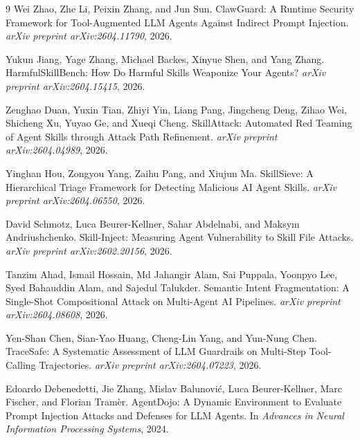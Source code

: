 \documentclass{article}
\begin{document}
{\begin{thebibliography}{9}
Wei Zhao, Zhe Li, Peixin Zhang, and Jun Sun.
\newblock ClawGuard: A Runtime Security Framework for Tool-Augmented LLM Agents Against Indirect Prompt Injection.
\newblock \emph{arXiv preprint arXiv:2604.11790}, 2026.

Yukun Jiang, Yage Zhang, Michael Backes, Xinyue Shen, and Yang Zhang.
\newblock HarmfulSkillBench: How Do Harmful Skills Weaponize Your Agents?
\newblock \emph{arXiv preprint arXiv:2604.15415}, 2026.

Zenghao Duan, Yuxin Tian, Zhiyi Yin, Liang Pang, Jingcheng Deng, Zihao Wei, Shicheng Xu, Yuyao Ge, and Xueqi Cheng.
\newblock SkillAttack: Automated Red Teaming of Agent Skills through Attack Path Refinement.
\newblock \emph{arXiv preprint arXiv:2604.04989}, 2026.

Yinghan Hou, Zongyou Yang, Zaihu Pang, and Xiujun Ma.
\newblock SkillSieve: A Hierarchical Triage Framework for Detecting Malicious AI Agent Skills.
\newblock \emph{arXiv preprint arXiv:2604.06550}, 2026.

David Schmotz, Luca Beurer-Kellner, Sahar Abdelnabi, and Maksym Andriushchenko.
\newblock Skill-Inject: Measuring Agent Vulnerability to Skill File Attacks.
\newblock \emph{arXiv preprint arXiv:2602.20156}, 2026.

Tanzim Ahad, Ismail Hossain, Md Jahangir Alam, Sai Puppala, Yoonpyo Lee, Syed Bahauddin Alam, and Sajedul Talukder.
\newblock Semantic Intent Fragmentation: A Single-Shot Compositional Attack on Multi-Agent AI Pipelines.
\newblock \emph{arXiv preprint arXiv:2604.08608}, 2026.

Yen-Shan Chen, Sian-Yao Huang, Cheng-Lin Yang, and Yun-Nung Chen.
\newblock TraceSafe: A Systematic Assessment of LLM Guardrails on Multi-Step Tool-Calling Trajectories.
\newblock \emph{arXiv preprint arXiv:2604.07223}, 2026.

Edoardo Debenedetti, Jie Zhang, Mislav Balunovi{\'c}, Luca Beurer-Kellner, Marc Fischer, and Florian Tram{\`e}r.
\newblock AgentDojo: A Dynamic Environment to Evaluate Prompt Injection Attacks and Defenses for LLM Agents.
\newblock In \emph{Advances in Neural Information Processing Systems}, 2024.


\end{thebibliography}}
\end{document}
